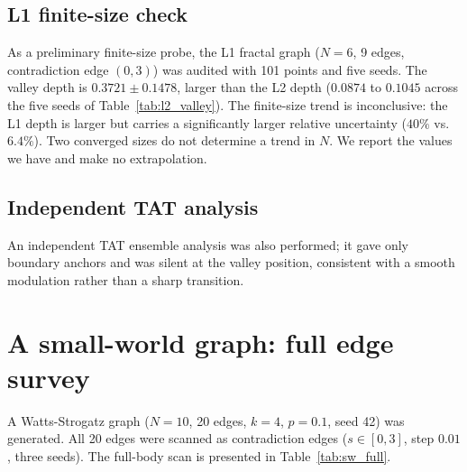 \documentclass[pdflatex,sn-mathphys-num,iicol]{sn-jnl}
\begin{document}
\subsection{L1 finite-size check}

As a preliminary finite-size probe, the L1 fractal graph ($N=6$, 9 edges, contradiction edge $(0,3)$) was audited with 101 points and five seeds. The valley depth is $0.3721\pm0.1478$, larger than the L2 depth ($0.0874$ to $0.1045$ across the five seeds of Table~\ref{tab:l2_valley}). The finite-size trend is inconclusive: the L1 depth is larger but carries a significantly larger relative uncertainty ($40\%$ vs.\ $6.4\%$). Two converged sizes do not determine a trend in $N$. We report the values we have and make no extrapolation.

\subsection{Independent TAT analysis}

An independent TAT ensemble analysis was also performed; it gave only boundary anchors and was silent at the valley position, consistent with a smooth modulation rather than a sharp transition.

\section{A small-world graph: full edge survey}

A Watts-Strogatz graph ($N=10$, 20 edges, $k=4$, $p=0.1$, seed 42) was generated. All 20 edges were scanned as contradiction edges ($s\in[0,3]$, step $0.01$, three seeds). The full-body scan is presented in Table~\ref{tab:sw_full}.
\end{document}
